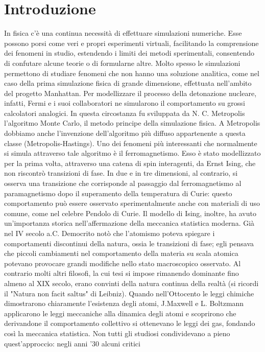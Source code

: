 \documentclass[a4paper]{article}
\begin{document}
\section{Introduzione}
In fisica c'è una continua necessità di effettuare simulazioni numeriche. Esse possono porsi come veri e propri esperimenti virtuali, facilitando la comprensione dei fenomeni in studio, estendendo i limiti dei metodi sperimentali, consentendo di confutare alcune teorie o di formularne altre. Molto spesso le simulazioni permettono di studiare fenomeni che non hanno una soluzione analitica, come nel caso della prima simulazione fisica di grande dimensione, effettuata nell'ambito del progetto Manhattan. Per modellizzare il processo della detonazione nucleare, infatti, Fermi e i suoi collaboratori ne simularono il comportamento su grossi calcolatori analogici. In questa circostanza fu sviluppata da N. C. Metropolis l'algoritmo Monte Carlo, il metodo principe della simulazione fisica. A Metropolis dobbiamo anche l'invenzione dell'algoritmo più diffuso appartenente a questa classe (Metropolis-Hastings).
Uno dei fenomeni più interessanti che normalmente si simula attraverso tale algoritmo è il ferromagnetismo. Esso è stato modellizzato per la prima volta, attraverso una catena di spin interagenti, da Ernst Ising, che non riscontrò transizioni di fase. In due e in tre dimensioni, al contrario, si osserva una transizione che corrisponde al passaggio dal ferromagnetismo al paramagnetismo dopo il superamento della temperatura di Curie: questo comportamento può essere osservato sperimentalmente anche con materiali di uso comune, come nel celebre Pendolo di Curie. Il modello di Ising, inoltre, ha avuto un'importanza storica nell'affermazione della meccanica statistica moderna.
Già nel IV secolo a.C. Democrito notò che l'atomismo poteva spiegare i comportamenti discontinui della natura, ossia le transizioni di fase; egli pensava che piccoli cambiamenti nel comportamento della materia su scala atomica potevano provocare grandi modifiche nello stato macroscopico osservato. 
Al contrario molti altri filosofi, la cui tesi si impose rimanendo dominante fino almeno al XIX secolo, erano convinti della natura continua della realtà (si ricordi il "Natura non facit saltus" di Leibniz).
Quando nell'Ottocento le leggi chimiche dimostrarono chiaramente l'esistenza degli atomi, J.Maxwell e L. Boltzmann applicarono le leggi meccaniche alla dinamica degli atomi e scoprirono che derivandone il comportamento collettivo si ottenevano le leggi dei gas, fondando così la meccanica statistica. Non tutti gli studiosi condividevano a pieno quest'approccio: negli anni '30 alcuni critici
\end{document}
